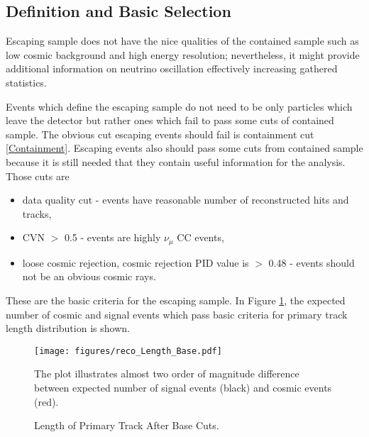 \subsection{Definition and Basic Selection} \label{base_cut}
Escaping sample does not have the nice qualities of the contained sample such as low cosmic background and
high energy resolution; nevertheless, it might provide additional information on neutrino oscillation
effectively increasing gathered statistics. 

Events which define the escaping sample do not need to be only particles which leave the detector but
rather ones which fail to pass some cuts of contained sample. The obvious cut escaping events should 
fail is containment cut \ref{Containment}. Escaping events also should pass some cuts from contained 
sample because it is still needed that they contain useful information for the analysis. Those cuts are
\begin{itemize}
\item data quality cut - events have reasonable number of reconstructed hits and tracks,
\item CVN $>$ 0.5 - events are highly $\nu_\mu$ CC events,
\item loose cosmic rejection, cosmic rejection PID value is $>$ 0.48 - events should not be an obvious 
cosmic rays.
\end{itemize}

These are the basic criteria for the escaping sample. In Figure \ref{fig:length_1}, the
expected number of cosmic and signal events which pass basic criteria for primary track length
distribution is shown.
\begin{figure}[h]
\centering
\texttt{[image: figures/reco\_Length\_Base.pdf]}
\caption{Length of Primary Track After Base Cuts.}
{The plot illustrates almost two order of magnitude difference between expected number of signal events 
(black) and cosmic events (red). }
\label{fig:length_1}
\end{figure}

